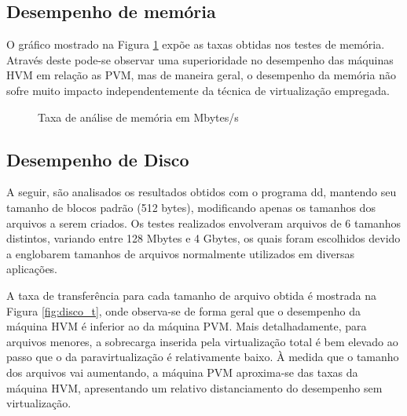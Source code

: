 \documentclass[times, 10pt,twocolumn]{article}
\begin{document}
\subsection{Desempenho de memória}
O gráfico mostrado na Figura \ref{fig:mem}  expõe as taxas obtidas nos testes de 
memória. Através deste pode-se observar uma  superioridade no desempenho das máquinas 
HVM em relação as PVM, mas de maneira geral, o desempenho da memória não sofre 
muito impacto independentemente da técnica de virtualização empregada. 

\begin{figure}[!htb]
\centering
{}
\caption{Taxa de análise de memória em Mbytes/s}
\label{fig:mem}
\end{figure}

\subsection{Desempenho de Disco}
A seguir, são analisados os resultados obtidos com o programa dd,
mantendo seu tamanho de blocos padrão (512 bytes), modificando apenas os tamanhos dos 
arquivos a serem criados. Os testes realizados envolveram arquivos de 6 tamanhos 
distintos, variando entre 128 Mbytes e 4 Gbytes, os quais foram escolhidos devido a 
englobarem tamanhos de arquivos normalmente utilizados em diversas aplicações.

A taxa de transferência para cada tamanho de arquivo obtida é mostrada na 
Figura \ref{fig:disco_t}, onde observa-se de forma geral que o desempenho da máquina
HVM é inferior ao da máquina PVM.  Mais detalhadamente, para arquivos menores, 
a sobrecarga inserida pela virtualização total é bem elevado ao passo que o 
da paravirtualização é relativamente baixo. À medida que o tamanho dos arquivos vai 
aumentando, a máquina PVM aproxima-se das taxas da máquina HVM, apresentando um 
relativo distanciamento do desempenho sem virtualização. 
\end{document}
